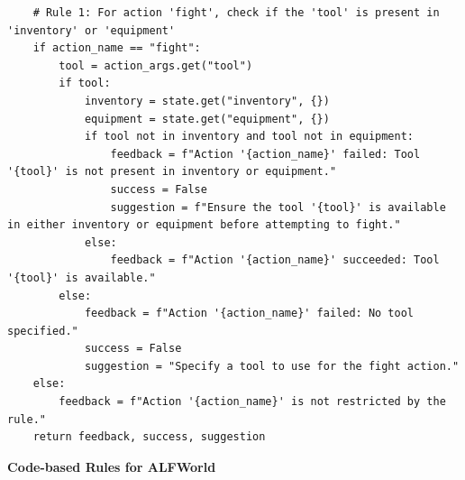 \documentclass{article} %
\begin{document}
\begin{lstlisting}
    # Rule 1: For action 'fight', check if the 'tool' is present in 'inventory' or 'equipment'
    if action_name == "fight":
        tool = action_args.get("tool")
        if tool:
            inventory = state.get("inventory", {})
            equipment = state.get("equipment", {})
            if tool not in inventory and tool not in equipment:
                feedback = f"Action '{action_name}' failed: Tool '{tool}' is not present in inventory or equipment."
                success = False
                suggestion = f"Ensure the tool '{tool}' is available in either inventory or equipment before attempting to fight."
            else:
                feedback = f"Action '{action_name}' succeeded: Tool '{tool}' is available."
        else:
            feedback = f"Action '{action_name}' failed: No tool specified."
            success = False
            suggestion = "Specify a tool to use for the fight action."
    else:
        feedback = f"Action '{action_name}' is not restricted by the rule."
    return feedback, success, suggestion
\end{lstlisting}










\begin{center}
    \textbf{Code-based Rules for ALFWorld}
\end{center}
\end{document}
